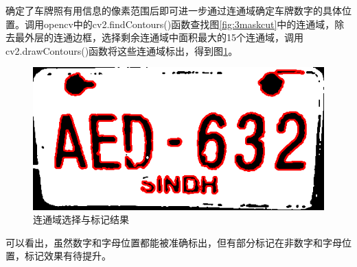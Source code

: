 \documentclass[a4paper]{ctexart}
\begin{document}
\begin{spacing}{1.35}
	确定了车牌照有用信息的像素范围后即可进一步通过连通域确定车牌数字的具体位置。调用opencv中的cv2.findContours()函数查找图\ref{fig:3maskcut}中的连通域，除去最外层的连通边框，选择剩余连通域中面积最大的15个连通域，调用cv2.drawContours()函数将这些连通域标出，得到图\ref{fig:3maskcutsel}。
	\begin{figure}[htbp]
		\centering
		\includegraphics[width=\textwidth]{figure/3maskcut_sel.png}
		\caption{连通域选择与标记结果}\label{fig:3maskcutsel}
	\end{figure}
	可以看出，虽然数字和字母位置都能被准确标出，但有部分标记在非数字和字母位置，标记效果有待提升。


\end{spacing}
\end{document}
